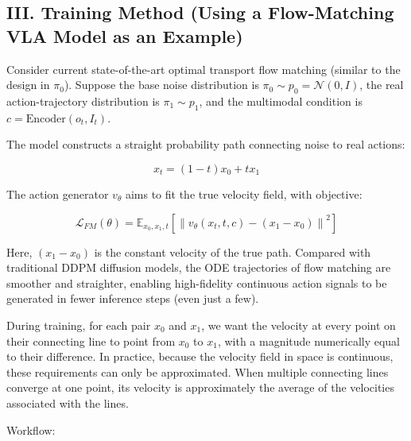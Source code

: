 \hypertarget{iii.-training-method-using-a-flow-matching-vla-model-as-an-example}{%
\subsection{III. Training Method (Using a Flow-Matching VLA Model as an Example)}\label{iii.-training-method-using-a-flow-matching-vla-model-as-an-example}}

Consider current state-of-the-art optimal transport flow matching (similar to the design in \(\pi_0\)). Suppose the base noise distribution is \(\pi_0\sim p_0=\mathcal{N}(0,I)\), the real action-trajectory distribution is \(\pi_1\sim p_1\), and the multimodal condition is \(c=\mathrm{Encoder}(o_t,I_t)\).

The model constructs a straight probability path connecting noise to real actions:

\[
x_t=(1-t)x_0+tx_1
\]

The action generator \(v_\theta\) aims to fit the true velocity field, with objective:

\[
\mathcal{L}_{FM}(\theta)=\mathbb{E}_{x_0,x_1,t}\left[\left\|v_\theta(x_t,t,c)-(x_1-x_0)\right\|^2\right]
\]

Here, \((x_1-x_0)\) is the constant velocity of the true path. Compared with traditional DDPM diffusion models, the ODE trajectories of flow matching are smoother and straighter, enabling high-fidelity continuous action signals to be generated in fewer inference steps (even just a few).

During training, for each pair \(x_0\) and \(x_1\), we want the velocity at every point on their connecting line to point from \(x_0\) to \(x_1\), with a magnitude numerically equal to their difference. In practice, because the velocity field in space is continuous, these requirements can only be approximated. When multiple connecting lines converge at one point, its velocity is approximately the average of the velocities associated with the lines.

Workflow:

